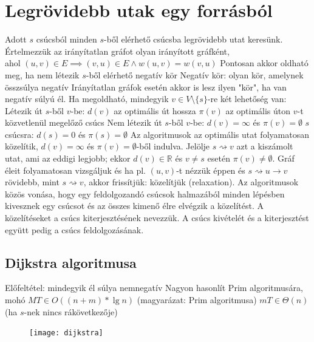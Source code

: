 \documentclass[12pt,a4paper]{article}
\renewcommand{\leadsto}{\rightsquigarrow}
\begin{document}
\pagebreak

\section{Legrövidebb utak egy forrásból}

\begin{outline}
	\1 Adott $s$ csúcsból minden $s$-ből elérhető csúcsba legrövidebb utat keresünk.
	\1 Értelmezzük az irányítatlan gráfot olyan irányított gráfként,\\
	ahol $(u,v) \in E \implies (v,u) \in E \wedge w(u,v) = w(v,u)$
	\1 Pontosan akkor oldható meg, ha nem létezik $s$-ből elérhető negatív kör
		\2 Negatív kör: olyan kör, amelynek összsúlya negatív
		\2 Irányítatlan gráfok esetén akkor is lesz ilyen "kör", ha van negatív súlyú él.
	\1 Ha megoldható, mindegyik $v \in V \setminus \{s\}$-re két lehetőség van:
		\2 Létezik út $s$-ből $v$-be:
			\3 $d(v)$ az optimális út hossza
			\3 $\pi(v)$ az optimális úton $v$-t közvetlenül megelőző csúcs
		\2 Nem létezik út $s$-ből $v$-be: $d(v)=\infty$ és $\pi(v)=\emptyset$
		\2 $s$ csúcsra: $d(s)=0$ és $\pi(s)=\emptyset$
	\1 Az algoritmusok az optimális utat folyamatosan közelítik, $d(v)=\infty$ és $\pi(v)=\emptyset$-ből indulva. Jelölje $s \leadsto v$ azt a kiszámolt utat, ami az eddigi legjobb; ekkor $d(v)\in \mathbb{R}$ és $v \ne s$ esetén $\pi(v) \ne \emptyset$. Gráf éleit folyamatosan vizsgáljuk és ha pl. $(u,v)$-t nézzük éppen és $s\leadsto u \to v$ rövidebb,
	mint $s \leadsto v$, akkor frissítjük: közelítjük (relaxation).
	\1 Az algoritmusok közös vonása, hogy egy feldolgozandó csúcsok halmazából minden lépésben kivesznek egy csúcsot és az összes kimenő élre elvégzik a közelítést. A közelítéseket a csúcs kiterjesztésének nevezzük. A csúcs kivételét és a kiterjesztést együtt pedig a csúcs feldolgozásának.
\end{outline}

\pagebreak

\subsection{Dijkstra algoritmusa}

\begin{outline}
	\1 Előfeltétel: mindegyik él súlya nemnegatív
	\1 Nagyon hasonlít Prim algoritmusára, mohó
		\2 $MT \in O((n+m)*\lg n)$ (magyarázat: Prim algoritmusa)
		\2 $mT \in \Theta(n)$ (ha $s$-nek nincs rákövetkezője)
\end{outline}

\begin{figure}[h!]
	\centering
	\texttt{[image: dijkstra]}
\end{figure}
\end{document}
